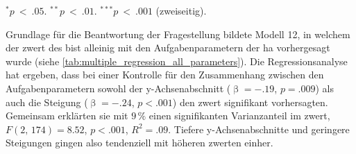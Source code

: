\documentclass[11pt, twoside, a4paper]{book}		%
\begin{document}
\begin{table}[b]
\begin{adjustbox}{width=1\textwidth}
\begin{threeparttable}
			\begin{tablenotes}[flushleft]
				\footnotesize				%
				\setlength{}	%
				\item $^{*}p~<~.05$. $^{**}p~<~.01$. $^{***}p~<~.001$ (zweiseitig).
			\end{tablenotes}
		\end{threeparttable}
	\end{adjustbox}
\end{table}



Grundlage für die Beantwortung der Fragestellung bildete Modell 12, in welchem der \gls{zwert} des \gls{bist} alleinig mit den Aufgabenparametern der \gls{ha} vorhergesagt wurde (siehe \autoref{tab:multiple_regression_all_parameters}).
Die Regressionsanalyse hat ergeben, dass bei einer Kontrolle für den Zusammenhang zwischen den Aufgabenparametern sowohl der y-Achsenabschnitt ($\upbeta=-.19$, $p=.009$) als auch die Steigung ($\upbeta=-.24$, $p<.001$) den \gls{zwert} signifikant vorhersagten. Gemeinsam erklärten sie mit $9\,\%$ einen signifikanten Varianzanteil im \gls{zwert}, $F(2,\,174)=8.52$, $p<.001$, $R^2=.09$. Tiefere y-Achsenabschnitte und geringere Steigungen gingen also tendenziell mit höheren \gls{zwert}en einher.

\end{document}
